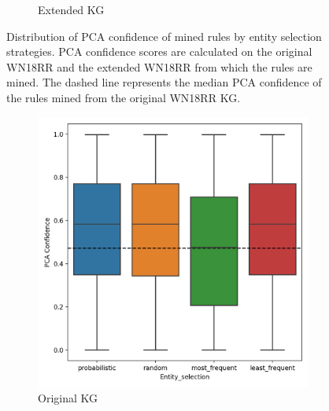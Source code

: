 \begin{figure}[h]
\begin{subfigure}{.5\textwidth}
  \caption{Extended KG}
  \label{fig:_PCA_entity_wn18rr_boxplot_sub}
\end{subfigure}
\caption{Distribution of PCA confidence of mined rules by entity selection strategies. PCA confidence scores are calculated on the original WN18RR and the extended WN18RR from which the rules are mined. The dashed line represents the median PCA confidence of the rules mined from the original WN18RR KG.}
\label{fig:PCA_entity_wn18rr_boxplot}
\end{figure}

\begin{figure}[h]
\centering
\begin{subfigure}{.5\textwidth}
  \centering
  \includegraphics[width=1\linewidth]{figures/results/entity_selection/PCA-entity_family.png}
  \caption{Original KG}
  \label{fig:models_entity_boxplot_sub}
\end{subfigure}%
\begin{subfigure}{.5\textwidth}
  \centering

\end{subfigure}
\end{figure}
